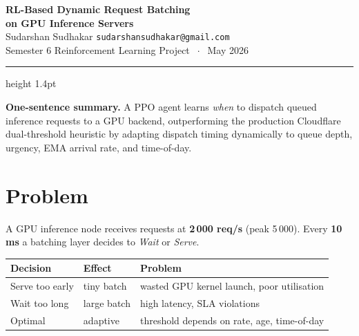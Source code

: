 \documentclass[11pt,a4paper]{article}
\begin{document}

\begin{center}
  {\LARGE\bfseries\color{darkGray}%
   RL-Based Dynamic Request Batching\\[4pt]
   \large on GPU Inference Servers}\\[8pt]
  {\large Sudarshan Sudhakar \quad \texttt{sudarshansudhakar@gmail.com}}\\[4pt]
  {\normalsize Semester 6 Reinforcement Learning Project $\;\cdot\;$ May 2026}
  \vspace{8pt}
  \hrule height 1.4pt
\end{center}

\vspace{4pt}
\begin{infobox}
\textbf{One-sentence summary.}\; A PPO agent learns \emph{when} to dispatch
queued inference requests to a GPU backend, outperforming the production
Cloudflare dual-threshold heuristic by adapting dispatch timing dynamically
to queue depth, urgency, EMA arrival rate, and time-of-day.
\end{infobox}
\vspace{8pt}

\section{Problem}

A GPU inference node receives requests at \textbf{2\,000 req/s} (peak 5\,000).
Every \textbf{10\,ms} a batching layer decides to \emph{Wait} or \emph{Serve}.

\medskip
\renewcommand{\arraystretch}{1.25}
\begin{tabular}{@{}lll@{}}
\toprule
\textbf{Decision} & \textbf{Effect} & \textbf{Problem} \\
\midrule
Serve too early & tiny batch & wasted GPU kernel launch, poor utilisation \\
Wait too long   & large batch & high latency, SLA violations \\
Optimal         & adaptive    & threshold depends on rate, age, time-of-day \\
\bottomrule
\end{tabular}
\end{document}
